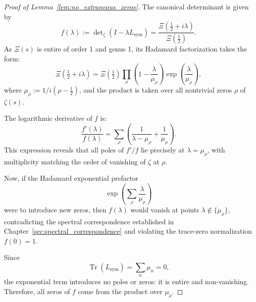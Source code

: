 \begin{proof}[Proof of Lemma~\ref{lem:no_extraneous_zeros}]
The canonical determinant is given by
\[
f(\lambda) := \det\nolimits_\zeta(I - \lambda L_{\mathrm{sym}})
= \frac{\Xi\left(\tfrac{1}{2} + i\lambda\right)}{\Xi\left(\tfrac{1}{2}\right)}.
\]
As \( \Xi(s) \) is entire of order 1 and genus 1, its Hadamard factorization takes the form:
\[
\Xi\left(\tfrac{1}{2} + i\lambda\right)
= \Xi\left(\tfrac{1}{2}\right)
\prod_{\rho} \left(1 - \frac{\lambda}{\mu_\rho} \right)
\exp\left( \frac{\lambda}{\mu_\rho} \right),
\]
where \( \mu_\rho := 1/i(\rho - \tfrac{1}{2}) \), and the product is taken over all nontrivial zeros \( \rho \) of \( \zeta(s) \).

The logarithmic derivative of \( f \) is:
\[
\frac{f'(\lambda)}{f(\lambda)}
= \sum_\rho \left( \frac{1}{\lambda - \mu_\rho} + \frac{1}{\mu_\rho} \right).
\]
This expression reveals that all poles of \( f'/f \) lie precisely at \( \lambda = \mu_\rho \), with multiplicity matching the order of vanishing of \( \zeta \) at \( \rho \).

Now, if the Hadamard exponential prefactor
\[
\exp\left( \sum_\rho \frac{\lambda}{\mu_\rho} \right)
\]
were to introduce new zeros, then \( f(\lambda) \) would vanish at points \( \lambda \notin \{ \mu_\rho \} \), contradicting the spectral correspondence established in Chapter~\ref{sec:spectral_correspondence} and violating the trace-zero normalization \( f(0) = 1 \).

Since
\[
\operatorname{Tr}(L_{\mathrm{sym}}) = \sum_n \mu_n = 0,
\]
the exponential term introduces no poles or zeros: it is entire and non-vanishing. Therefore, all zeros of \( f \) come from the product over \( \mu_\rho \).

\end{proof}
% 